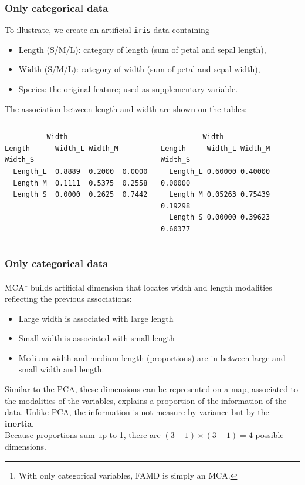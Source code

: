 \begin{frame}[fragile]
\frametitle{Only categorical data}
To illustrate, we create an artificial {\tt iris} data containing
\begin{itemize}
\item Length (S/M/L): category of length (sum of petal and sepal length),
\item Width (S/M/L): category of width (sum of petal and sepal width),
\item Species: the original feature; used as supplementary variable.
\end{itemize}
The association between length and width are shown on the tables:\\
\scriptsize
\begin{columns}
\begin{column}{0.5\linewidth}
\begin{verbatim}
          Width
Length      Width_L Width_M Width_S
  Length_L  0.8889  0.2000  0.0000
  Length_M  0.1111  0.5375  0.2558
  Length_S  0.0000  0.2625  0.7442
\end{verbatim}
\end{column}
\vrule
\hspace{0.2cm}
\begin{column}{0.5\linewidth}
\begin{verbatim}
          Width
Length     Width_L Width_M Width_S
  Length_L 0.60000 0.40000 0.00000
  Length_M 0.05263 0.75439 0.19298
  Length_S 0.00000 0.39623 0.60377
\end{verbatim}
\end{column}
\end{columns}
\normalsize
\end{frame}
\begin{frame}
\frametitle{Only categorical data}
MCA\footnote{With only categorical variables, FAMD is simply an MCA.} builds artificial dimension that locates width and length modalities reflecting the previous associations:
\begin{itemize}
\item Large width is associated with large length
\item Small width is associated with small length
\item Medium width and medium length (proportions) are in-between large and small width and length.
\end{itemize}
Similar to the PCA, these dimensions can be represented on a map, associated to the modalities of the variables, explains a proportion of the information of the data. Unlike PCA, the information is not measure by variance but by the {\bf inertia}.\\
\vspace{0.3cm}
Because proportions sum up to 1, there are $(3-1)\times (3-1) = 4$ possible dimensions. 
\end{frame}
